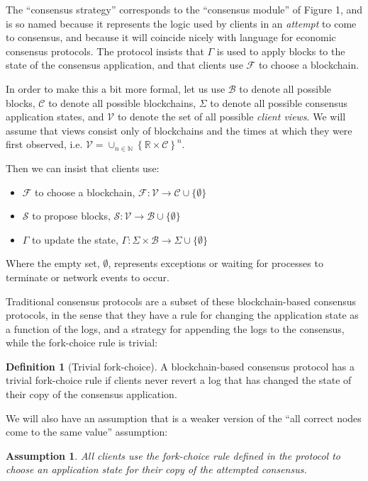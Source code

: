 \documentclass[11pt,a4paper]{article}
\theoremstyle{plain}
\newtheorem{assm}{Assumption}
\theoremstyle{definition}
\newtheorem{defn}{Definition}
\begin{document}
The ``consensus strategy'' corresponds to the ``consensus module'' of Figure 1, and is so named because it represents the logic used by clients in an \emph{attempt} to come to consensus, and because it will coincide nicely with language for economic consensus protocols. The protocol insists that $\Gamma$ is used to apply blocks to the state of the consensus application, and that clients use $\mathcal{F}$ to choose a blockchain. 

In order to make this a bit more formal, let us use $\mathcal{B}$ to denote all possible blocks, $\mathcal{C}$ to denote all possible blockchains, $\Sigma$ to denote all possible consensus application states, and $\mathcal{V}$ to denote the set of all possible \emph{client views}. We will assume that views consist only of blockchains and the times at which they were first observed, i.e. $\mathcal{V} = \cup_{n \in \mathbb{N}}\left\{\mathbb{R} \times \mathcal{C}\right\}^n$.

Then we can insist that clients use:
\begin{itemize}
\item $\mathcal{F}$ to choose a blockchain, $\mathcal{F}:\mathcal{V} \to \mathcal{C} \cup \{\emptyset \}$
\item $\mathcal{S}$ to propose blocks, $\mathcal{S}: \mathcal{V} \to \mathcal{B} \cup \{\emptyset \}$
\item $\Gamma$ to update the state, $\Gamma: \Sigma \times \mathcal{B} \to \Sigma \cup \{\emptyset \}$
\end{itemize}

Where the empty set, $\emptyset$, represents exceptions or waiting for processes to terminate or network events to occur.

Traditional consensus protocols are a subset of these blockchain-based consensus protocols, in the sense that they have a rule for changing the application state as a function of the logs, and a strategy for appending the logs to the consensus, while the fork-choice rule is trivial:

\begin{defn}[Trivial fork-choice]
A blockchain-based consensus protocol has a trivial fork-choice rule if clients never revert a log that has changed the state of their copy of the consensus application.
\end{defn}

We will also have an assumption that is a weaker version of the ``all correct nodes come to the same value'' assumption:

\begin{assm}
All clients use the fork-choice rule defined in the protocol to choose an application state for their copy of the attempted consensus.
\end{assm}
\end{document}

